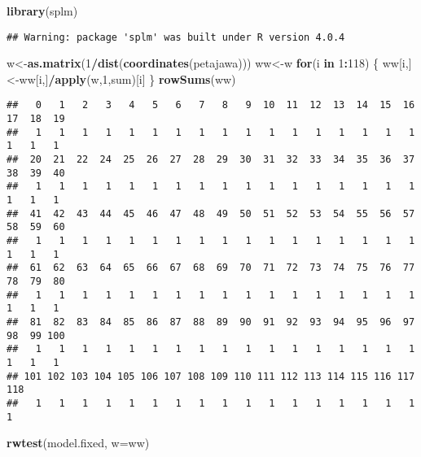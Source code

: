 \documentclass[
]{book}
\newenvironment{Shaded}{\begin{snugshade}}{\end{snugshade}}
\newcommand{\ControlFlowTok}[1]{\textcolor[rgb]{0.13,0.29,0.53}{\textbf{#1}}}
\newcommand{\DataTypeTok}[1]{\textcolor[rgb]{0.13,0.29,0.53}{#1}}
\newcommand{\DecValTok}[1]{\textcolor[rgb]{0.00,0.00,0.81}{#1}}
\newcommand{\KeywordTok}[1]{\textcolor[rgb]{0.13,0.29,0.53}{\textbf{#1}}}
\newcommand{\NormalTok}[1]{#1}
\newcommand{\OperatorTok}[1]{\textcolor[rgb]{0.81,0.36,0.00}{\textbf{#1}}}
\begin{document}
\begin{Shaded}
\begin{Highlighting}[]
\KeywordTok{library}\NormalTok{(splm)}
\end{Highlighting}
\end{Shaded}

\begin{verbatim}
## Warning: package 'splm' was built under R version 4.0.4
\end{verbatim}

\begin{Shaded}
\begin{Highlighting}[]
\NormalTok{w\textless{}{-}}\KeywordTok{as.matrix}\NormalTok{(}\DecValTok{1}\OperatorTok{/}\KeywordTok{dist}\NormalTok{(}\KeywordTok{coordinates}\NormalTok{(petajawa)))}
\NormalTok{ww\textless{}{-}w}
\ControlFlowTok{for}\NormalTok{(i }\ControlFlowTok{in} \DecValTok{1}\OperatorTok{:}\DecValTok{118}\NormalTok{)}
\NormalTok{\{}
\NormalTok{ww[i,]\textless{}{-}ww[i,]}\OperatorTok{/}\KeywordTok{apply}\NormalTok{(w,}\DecValTok{1}\NormalTok{,sum)[i]}
\NormalTok{\}}
\KeywordTok{rowSums}\NormalTok{(ww)}
\end{Highlighting}
\end{Shaded}

\begin{verbatim}
##   0   1   2   3   4   5   6   7   8   9  10  11  12  13  14  15  16  17  18  19 
##   1   1   1   1   1   1   1   1   1   1   1   1   1   1   1   1   1   1   1   1 
##  20  21  22  24  25  26  27  28  29  30  31  32  33  34  35  36  37  38  39  40 
##   1   1   1   1   1   1   1   1   1   1   1   1   1   1   1   1   1   1   1   1 
##  41  42  43  44  45  46  47  48  49  50  51  52  53  54  55  56  57  58  59  60 
##   1   1   1   1   1   1   1   1   1   1   1   1   1   1   1   1   1   1   1   1 
##  61  62  63  64  65  66  67  68  69  70  71  72  73  74  75  76  77  78  79  80 
##   1   1   1   1   1   1   1   1   1   1   1   1   1   1   1   1   1   1   1   1 
##  81  82  83  84  85  86  87  88  89  90  91  92  93  94  95  96  97  98  99 100 
##   1   1   1   1   1   1   1   1   1   1   1   1   1   1   1   1   1   1   1   1 
## 101 102 103 104 105 106 107 108 109 110 111 112 113 114 115 116 117 118 
##   1   1   1   1   1   1   1   1   1   1   1   1   1   1   1   1   1   1
\end{verbatim}

\begin{Shaded}
\begin{Highlighting}[]
\KeywordTok{rwtest}\NormalTok{(model.fixed, }\DataTypeTok{w=}\NormalTok{ww)}
\end{Highlighting}
\end{Shaded}
\end{document}
